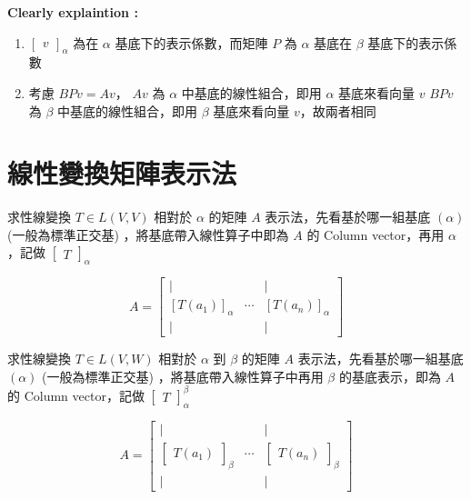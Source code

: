 \documentclass[
]{book}
\providecommand{\tightlist}{%
  \setlength{\itemsep}{0pt}\setlength{\parskip}{0pt}}
\begin{document}
\textbf{Clearly explaintion :}

\begin{enumerate}
\def\labelenumi{\arabic{enumi}.}
\tightlist
\item
  \(\begin{bmatrix}v\end{bmatrix}_{\alpha}\) 為在 \(\alpha\) 基底下的表示係數，而矩陣 \(P\) 為 \(\alpha\) 基底在 \(\beta\) 基底下的表示係數
\item
  考慮 \(BPv = Av\)， \(Av\) 為 \(\alpha\) 中基底的線性組合，即用 \(\alpha\) 基底來看向量 \(v\)
  \(BPv\) 為 \(\beta\) 中基底的線性組合，即用 \(\beta\) 基底來看向量 \(v\)，故兩者相同
\end{enumerate}

\hypertarget{ux7ddaux6027ux8b8aux63dbux77e9ux9663ux8868ux793aux6cd5}{%
\section{線性變換矩陣表示法}\label{ux7ddaux6027ux8b8aux63dbux77e9ux9663ux8868ux793aux6cd5}}

求性線變換 \(T \in L(V,V)\) 相對於 \(\alpha\) 的矩陣 \(A\) 表示法，先看基於哪一組基底 \((\alpha)\) (一般為標準正交基) ，將基底帶入線性算子中即為 \(A\) 的 Column vector，再用 \(\alpha\)，記做 \(\begin{bmatrix}T\end{bmatrix}_{\alpha}\)

\[
A = \begin{bmatrix}
\mid &  & \mid \\
[T(a_1)]_{\alpha} & \cdots & [T(a_n)]_{\alpha} \\
\mid &  & \mid
\end{bmatrix}
\]

求性線變換 \(T \in L(V,W)\) 相對於 \(\alpha\) 到 \(\beta\) 的矩陣 \(A\) 表示法，先看基於哪一組基底 \((\alpha)\) (一般為標準正交基) ，將基底帶入線性算子中再用 \(\beta\) 的基底表示，即為 \(A\) 的 Column vector，記做 \(\begin{bmatrix}T\end{bmatrix}_{\alpha}^{\beta}\)

\[
A = \begin{bmatrix}
\mid &  & \mid \\
\begin{bmatrix}T(a_1)\end{bmatrix}_{\beta} & \cdots & \begin{bmatrix}T(a_n)\end{bmatrix}_{\beta} \\
\mid &  & \mid
\end{bmatrix}
\]
\end{document}
